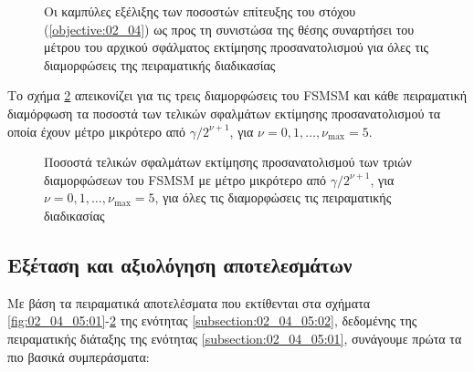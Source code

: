 \begin{figure}[!h]\centering
  \vspace{2cm}
  
  \vspace{1.5cm}
  \caption{\small Οι καμπύλες εξέλιξης των ποσοστών επίτευξης του στόχου
           (\ref{objective:02_04}) ως προς τη συνιστώσα της θέσης συναρτήσει του
           μέτρου του αρχικού σφάλματος εκτίμησης προσανατολισμού για όλες τις
           διαμορφώσεις της πειραματικής διαδικασίας}
  \label{fig:02_04_05:12}
\end{figure}

Το σχήμα \ref{fig:02_04_05:13} απεικονίζει για τις τρεις διαμορφώσεις του FSMSM
και κάθε πειραματική διαμόρφωση τα ποσοστά των τελικών σφαλμάτων εκτίμησης
προσανατολισμού τα οποία έχουν μέτρο μικρότερο από $\gamma / 2^{\nu+1}$, για
$\nu = 0,1,\dots,\nu_{\max} = 5$.

\begin{figure}[!h]\centering
  
  \vspace{-0.5cm}
  \caption{\small Ποσοστά τελικών σφαλμάτων εκτίμησης προσανατολισμού των
           τριών διαμορφώσεων του FSMSM με μέτρο μικρότερο από $\gamma /
           2^{\nu+1}$, για $\nu = 0,1,\dots,\nu_{\max} = 5$, για όλες τις
           διαμορφώσεις τις πειραματικής διαδικασίας}
  \label{fig:02_04_05:13}
\end{figure}




\subsection{Εξέταση και αξιολόγηση αποτελεσμάτων}
\label{subsection:02_04_05:03}

Με βάση τα πειραματικά αποτελέσματα που εκτίθενται στα σχήματα
\ref{fig:02_04_05:01}-\ref{fig:02_04_05:13} της ενότητας
\ref{subsection:02_04_05:02}, δεδομένης της πειραματικής διάταξης της ενότητας
\ref{subsection:02_04_05:01}, συνάγουμε πρώτα τα πιο βασικά συμπεράσματα:

